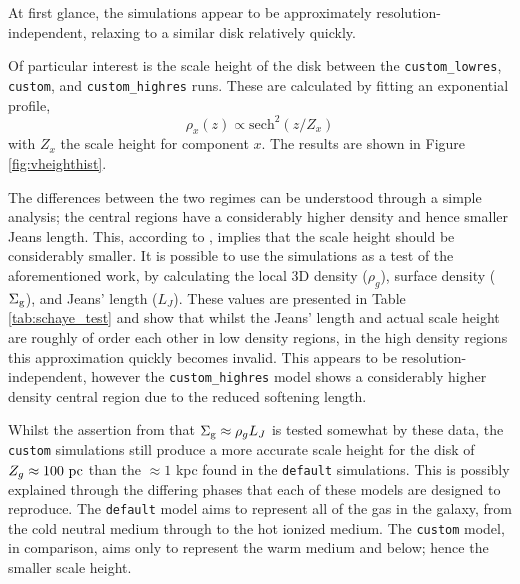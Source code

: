 At first glance, the simulations appear to be approximately resolution-independent, relaxing to a similar disk relatively quickly.

Of particular interest is the scale height of the disk between the {\tt custom\_lowres}, {\tt custom}, and {\tt custom\_highres} runs.
These are calculated by fitting an exponential profile,
$$
    \rho_x(z) \propto \mathrm{sech}^2\left(z/Z_x\right)
$$
with $Z_x$ the scale height for component $x$. The results are shown in Figure \ref{fig:vheighthist}.

The differences between the two regimes can be understood through a simple \citet{jeans_stability_1903} analysis; the central regions have a considerably higher density and hence smaller Jeans length.
This, according to \citet{schaye_model-independent_2001}, implies that the scale height should be considerably smaller.
It is possible to use the simulations as a test of the aforementioned work, by calculating the local 3D density ($\rho_g$), surface density ($\Sigma_\mathrm{g}$), and Jeans' length ($L_J$).
These values are presented in Table \ref{tab:schaye_test} and show that whilst the Jeans' length and actual scale height are roughly of order each other in low density regions, in the high density regions this approximation quickly becomes invalid.
This appears to be resolution-independent, however the {\tt custom\_highres} model shows a considerably higher density central region due to the reduced softening length.

Whilst the assertion from \citet{schaye_model-indepdent_2001} that $\Sigma_\mathrm{g} \approx \rho_g L_J$ is tested somewhat by these data, the {\tt custom} simulations still produce a more accurate scale height for the disk of $Z_g \approx 100 ~\mathrm{pc}$ than the $\approx 1$ kpc found in the {\tt default} simulations.
This is possibly explained through the differing phases that each of these models are designed to reproduce.
The {\tt default} model aims to represent all of the gas in the galaxy, from the cold neutral medium through to the hot ionized medium.
The {\tt custom} model, in comparison, aims only to represent the warm medium and below; hence the smaller scale height.

